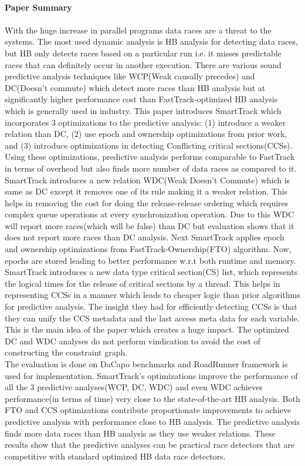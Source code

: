 \documentclass[20pt]{letter}
\begin{document}
\begin{enumerate}
{\textbf{\\Paper Summary}\\\\
With the huge increase in parallel programs data races are a threat to the systems. The most used dynamic analysis is HB analysis for detecting data races, but HB only detects races based on a particular run i.e. it misses predictable races that can definitely occur in another execution. There are various sound predictive analysis techniques like WCP(Weak causally precedes) and DC(Doesn't commute) which detect more races than HB analysis but at significantly higher performance cost than FastTrack-optimized HB analysis which is generally used in industry. This paper introduces SmartTrack which incorporates 3 optimizations to the predictive analysis: (1) introduce a weaker relation than DC, (2) use epoch and ownership optimizations from prior work, and (3) introduce optimizations in detecting Conflicting critical sections(CCSs). Using these optimizations, predictive analysis performs comparable to FastTrack in terms of overhead but also finds more number of data races as compared to it.\\

SmartTrack introduces a new relation WDC(Weak Doesn't Commute) which is same as DC except it removes one of its rule making it a weaker relation. This helps in removing the cost for doing the release-release ordering which requires complex queue operations at every synchronization operation. Due to this WDC will report more races(which will be false) than DC but evaluation shows that it does not report more races than DC analysis. Next SmartTrack applies epoch and ownership optimizations from FastTrack-Ownership(FTO) algorithm. Now, epochs are stored leading to better performance w.r.t both runtime and memory. SmartTrack introduces a new data type critical section(CS) list, which represents the logical times for the release of critical sections by a thread. This helps in representing CCSs in a manner which leads to cheaper logic than prior algorithms for predictive analysis. The insight they had for efficiently detecting CCSs is that they can unify the CCS metadata and the last access meta data for each variable. This is the main idea of the paper which creates a huge impact. The optimized DC and WDC analyses do not perform vindication to avoid the cost of constructing the constraint graph.\\

The evaluation is done on DaCapo benchmarks and RoadRunner framework is used for implementation. SmartTrack's optimizations improve the performance of all the 3 predictive analyses(WCP, DC, WDC) and even WDC achieves performance(in terms of time) very close to the state-of-the-art HB analysis. Both FTO and CCS optimizations contribute proportionate improvements to achieve predictive analysis with performance close to HB analysis. The predictive analysis finds more data races than HB analysis as they use weaker relations. These results show that the predictive analyses can be practical race detectors that are competitive with standard optimized HB data race detectors.

}
\end{enumerate}
\end{document}
